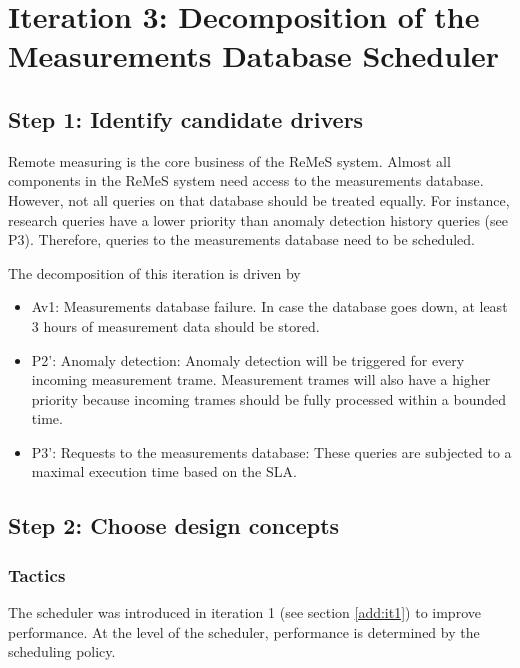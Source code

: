 \section{Iteration 3: Decomposition of the Measurements Database Scheduler}
\label{add:it3}

\subsection{Step 1: Identify candidate drivers}
\label{add:it3/drivers}

\npar Remote measuring is the core business of the ReMeS system. Almost all
components in the ReMeS system need access to the measurements database.
However, not all queries on that database should be treated equally. For
instance, research queries have a lower priority than anomaly detection history
queries (see P3). Therefore, queries to the measurements database need to be
scheduled.

\npar The decomposition of this iteration is driven by


\begin{itemize}
  	\item Av1: Measurements database failure. In case the database goes down, at
  	least 3 hours of measurement data should be stored.
	\item P2': Anomaly detection: Anomaly detection will be triggered for every
	incoming measurement trame. Measurement trames will also have a higher
	priority because incoming trames should be fully processed within a bounded
	time.
	\item P3': Requests to the measurements database: These queries are subjected
	to a maximal execution time based on the SLA. 
\end{itemize}

\subsection{Step 2: Choose design concepts}
\label{add:it3/concepts}

\subsubsection{Tactics}
\label{add:it3/tactics}


\npar The scheduler was introduced in iteration 1 (see section \ref{add:it1}) to
improve performance. At the level of the scheduler, performance is determined by
the scheduling policy. 

